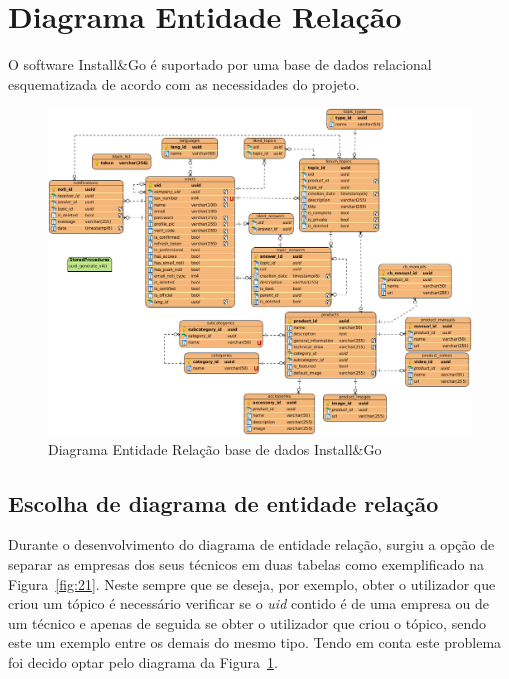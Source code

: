 \section{Diagrama Entidade Relação}

O software Install\&Go é suportado por uma base de dados relacional esquematizada de acordo com as necessidades do projeto.

\begin{figure}[htb]
  \centering
  
  \includegraphics[width=\textwidth]{images/diagramas/diagrama_bd.png}
  \caption{Diagrama Entidade Relação base de dados Install\&Go}
  \label{fig:20}
\end{figure}

\newpage

\subsection{Escolha de diagrama de entidade relação}
Durante o desenvolvimento do diagrama de entidade relação, surgiu 
a opção de separar as empresas dos seus técnicos em duas tabelas como 
exemplificado na Figura~\ref{fig:21}. Neste sempre que se
deseja, por exemplo, obter o utilizador que criou um tópico é necessário
verificar se o \textit{uid} contido é de uma empresa ou de um técnico e apenas de seguida se obter o utilizador que criou o tópico, sendo este um exemplo entre os demais do mesmo tipo. Tendo em conta este problema foi decido optar pelo diagrama da Figura~\ref{fig:20}.

